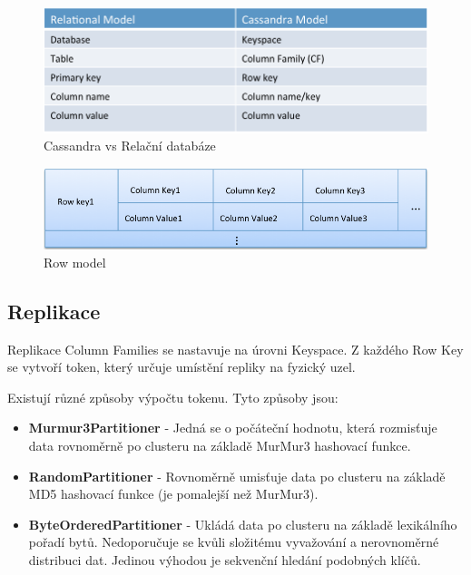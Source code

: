\documentclass{article}
\begin{document}
\begin{figure}[h]
\begin{center}
\includegraphics[scale=0.5]{analogy.png}
\caption{Cassandra vs Relační databáze}
\end{center}
\end{figure}

\begin{figure}[h]
\begin{center}
\includegraphics[scale=0.5]{RowModel.png}
\caption{Row model}
\end{center}
\end{figure}

\subsection*{Replikace}

Replikace Column Families se nastavuje na úrovni Keyspace. Z každého Row Key se vytvoří token, který určuje umístění repliky na fyzický uzel.\par

Existují různé způsoby výpočtu tokenu. Tyto způsoby jsou:

\begin{itemize}
\item \textbf{Murmur3Partitioner} - Jedná se o počáteční hodnotu, která rozmisťuje data rovnoměrně po clusteru na základě MurMur3 hashovací funkce.

\item \textbf{RandomPartitioner} -  Rovnoměrně umisťuje data po clusteru na základě MD5 hashovací funkce (je pomalejší než MurMur3).

\item \textbf{ByteOrderedPartitioner} - Ukládá data po clusteru na základě lexikálního pořadí bytů. Nedoporučuje se kvůli složitému vyvažování a nerovnoměrné distribuci dat. Jedinou výhodou je sekvenční hledání podobných klíčů.
\end{itemize}
\end{document}
